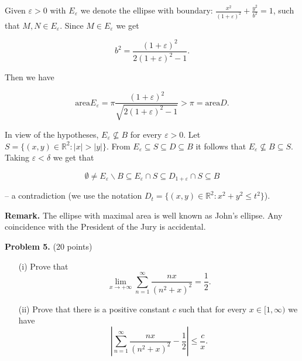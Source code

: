 \documentclass{article}
\begin{document}
Given \( \varepsilon > 0 \) with \( E_{\varepsilon} \) we denote the ellipse with boundary: \( \frac{x^2}{(1 + \varepsilon)^2} + \frac{y^2}{b^2} = 1 \), such that \( M, N \in E_{\varepsilon} \). Since \( M \in E_{\varepsilon} \) we get

\[ b^2 = \frac{(1 + \varepsilon)^2}{2(1 + \varepsilon)^2 - 1}. \]

Then we have

\[ \text{area} E_{\varepsilon} = \pi \frac{(1 + \varepsilon)^2}{\sqrt{2(1 + \varepsilon)^2 - 1}} > \pi = \text{area} D. \]

In view of the hypotheses, \( E_{\varepsilon} \nsubseteq B \) for every \( \varepsilon > 0 \). Let \( S = \{(x, y) \in \mathbb{R}^2 : |x| > |y|\} \). From \( E_{\varepsilon} \subseteq S \subseteq D \subseteq B \) it follows that \( E_{\varepsilon} \nsubseteq B \subseteq S \). Taking \( \varepsilon < \delta \) we get that

\[ \emptyset \neq E_{\varepsilon} \backslash B \subseteq E_{\varepsilon} \cap S \subseteq D_{1+\varepsilon} \cap S \subseteq B \]

-- a contradiction (we use the notation \( D_t = \{(x, y) \in \mathbb{R}^2 : x^2 + y^2 \leq t^2\} \)).

\textbf{Remark.} The ellipse with maximal area is well known as John’s ellipse. Any coincidence with the President of the Jury is accidental.

\textbf{Problem 5.} (20 points)
\begin{itemize}
    \item[(i)] Prove that
    \[
    \lim_{x \to +\infty} \sum_{n=1}^{\infty} \frac{nx}{(n^2 + x)^2} = \frac{1}{2}.
    \]
    \item[(ii)] Prove that there is a positive constant \( c \) such that for every \( x \in [1, \infty) \) we have
    \[
    \left| \sum_{n=1}^{\infty} \frac{nx}{(n^2 + x)^2} - \frac{1}{2} \right| \leq \frac{c}{x}.
    \]
\end{itemize}
\end{document}
